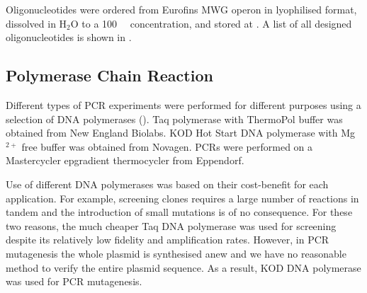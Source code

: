      Oligonucleotides were ordered from Eurofins MWG operon in lyophilised
      format, dissolved in H$_2$O to a \SI{100}{\micro\Molar} concentration,
      and stored at . A list of all designed oligonucleotides is
      shown in .

    \subsection{Polymerase Chain Reaction}
      Different types of PCR experiments were performed for different purposes
      using a selection of DNA polymerases ().
      Taq polymerase with ThermoPol
      buffer was obtained from New England Biolabs.
      KOD Hot Start DNA polymerase with Mg$^{2+}$
      free buffer was obtained from Novagen. PCRs were performed on a
      Mastercycler epgradient thermocycler from Eppendorf.

      Use of different DNA polymerases was based on their cost-benefit for
      each application. For example, screening clones requires a large number
      of reactions in tandem and the introduction of small mutations
      is of no consequence. For these two reasons, the much cheaper Taq DNA
      polymerase was used for screening despite its relatively low fidelity and
      amplification rates. However, in PCR mutagenesis the whole plasmid
      is synthesised anew and we have no reasonable method to verify
      the entire plasmid
      sequence. As a result, KOD DNA polymerase was used for PCR mutagenesis.

